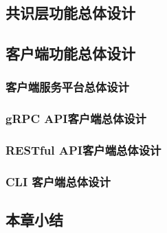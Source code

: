     \subsection{共识层功能总体设计}	

    \subsection{客户端功能总体设计}
	
        \subsubsection{客户端服务平台总体设计}
        \subsubsection{gRPC API客户端总体设计}
        \subsubsection{RESTful API客户端总体设计}       
        \subsubsection{CLI 客户端总体设计}
	
    \subsection{本章小结}

\clearpage